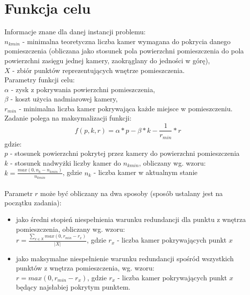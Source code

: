 \documentclass[12pt,a4paper]{article}
\begin{document}
\section{Funkcja celu}
Informacje znane dla danej instancji problemu: \\
$n_{kmin}$ - minimalna teoretyczna liczba kamer wymagana do pokrycia danego pomieszczenia
(obliczana jako stosunek pola powierzchni pomieszczenia do pola powierzchni zasięgu jednej kamery, zaokrąglany do jedności w górę),\\
$X$ - zbiór punktów reprezentujących wnętrze pomieszczenia. \\
%
\newline
Parametry funkcji celu: \\
$\alpha$ - zysk z pokrywania powierzchni pomieszczenia,\\
$\beta$ - koszt użycia nadmiarowej kamery, \\
$r_{min}$ - minimalna liczba kamer pokrywająca każde miejsce w pomieszczeniu. \\
%
\newline
Zadanie polega na maksymalizacji funkcji: \\
$$f(p, k, r) = \alpha * p - \beta * k - \frac{1}{r_{min}} * r $$ 
gdzie: \\
$p$ - stosunek powierzchni pokrytej przez kamery do powierzchni pomieszczenia \\
$k$ - stosunek nadwyżki liczby kamer do $n_{kmin}$, obliczany wg. wzoru: \\
\indent $k = \frac{max(0, n_k - n_{kmin})}{n_{kmin}}$, gdzie $n_k$ - liczba kamer w aktualnym stanie \\\\
Parametr $r$ może być obliczany na dwa sposoby (sposób ustalany jest na
początku zadania):
\begin{itemize}
\item jako średni stopień niespełnienia warunku redundancji dla punktu z wnętrza pomieszczenia, obliczany wg. wzoru: \\
\indent $r = \frac{\sum_{x \in X}^{} max(0, r_{min} - r_x)}{|X|}$, gdzie $r_x
$ - liczba kamer pokrywających punkt $x$
\item jako maksymalne niespełnienie warunku redundancji spośród wszystkich
punktów z wnętrza pomieszczenia, wg. wzoru:\\
$r = max(0, r_{min} - r_x)$, gdzie $r_x$ - liczba kamer pokrywających punkt $x$ będący najsłabiej pokrytym punktem.
\end{itemize}
\end{document}
